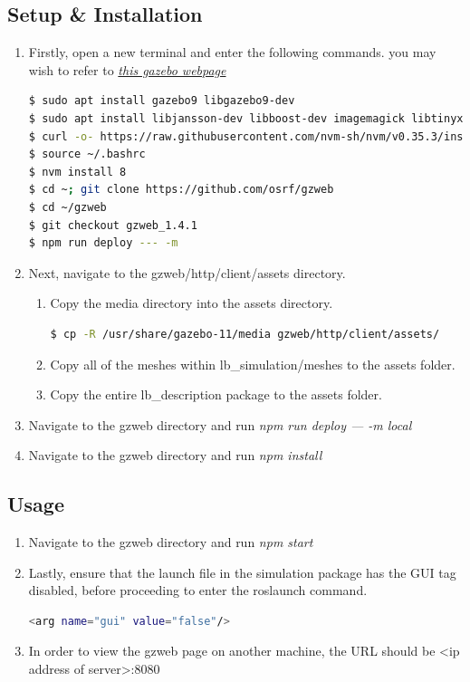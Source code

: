 \documentclass[11pt]{article}
\begin{document}
\subsection{Setup \& Installation}
\begin{enumerate}
 \item {
       Firstly, open a new terminal and enter the following commands.
       you may wish to refer to \href{https://classic.gazebosim.org/tutorials?tut=gzweb_install&cat=gzweb}{\emph{this gazebo webpage}}
       \begin{lstlisting}[language=bash]
$ sudo apt install gazebo9 libgazebo9-dev
$ sudo apt install libjansson-dev libboost-dev imagemagick libtinyxml-dev mercurial cmake build-essential
$ curl -o- https://raw.githubusercontent.com/nvm-sh/nvm/v0.35.3/install.sh | bash
$ source ~/.bashrc
$ nvm install 8
$ cd ~; git clone https://github.com/osrf/gzweb
$ cd ~/gzweb
$ git checkout gzweb_1.4.1
$ npm run deploy --- -m
       \end{lstlisting}
       }
 \item{
       Next, navigate to the gzweb/http/client/assets directory.
       \begin{enumerate}
        \item {
              Copy the media directory into the assets directory.
              \begin{lstlisting}[language=bash]
$ cp -R /usr/share/gazebo-11/media gzweb/http/client/assets/
              \end{lstlisting}
              }
        \item{
              Copy all of the meshes within lb\_simulation/meshes to the assets folder.
              }
        \item {
              Copy the entire lb\_description package to the assets folder.
              }
       \end{enumerate}
       }
 \item { Navigate to the gzweb directory and run \emph{npm run deploy --- -m local}}
 \item { Navigate to the gzweb directory and run \emph{npm install}}
\end{enumerate}
\subsection{Usage}
\begin{enumerate}

 \item { Navigate to the gzweb directory and run \emph{npm start}}
 \item{
       Lastly, ensure that the launch file in the simulation package has the GUI tag disabled, before proceeding to enter the roslaunch command.
       \begin{lstlisting}[language=bash]
          <arg name="gui" value="false"/>
       \end{lstlisting}
       }
 \item{
       In order to view the gzweb page on another machine, the URL should be <ip address of server>:8080
       }
\end{enumerate}
\end{document}
